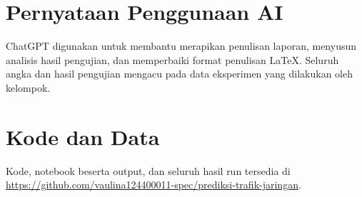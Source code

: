 \documentclass[conference,a4paper]{IEEEtran}
\begin{document}
\section*{Pernyataan Penggunaan AI}
ChatGPT digunakan untuk membantu merapikan penulisan laporan, menyusun analisis hasil pengujian, dan memperbaiki format penulisan LaTeX. Seluruh angka dan hasil pengujian mengacu pada data eksperimen yang dilakukan oleh kelompok.

\section*{Kode dan Data}
Kode, notebook beserta output, dan seluruh hasil run tersedia di \url{https://github.com/vaulina124400011-spec/prediksi-trafik-jaringan}.



\end{document}
